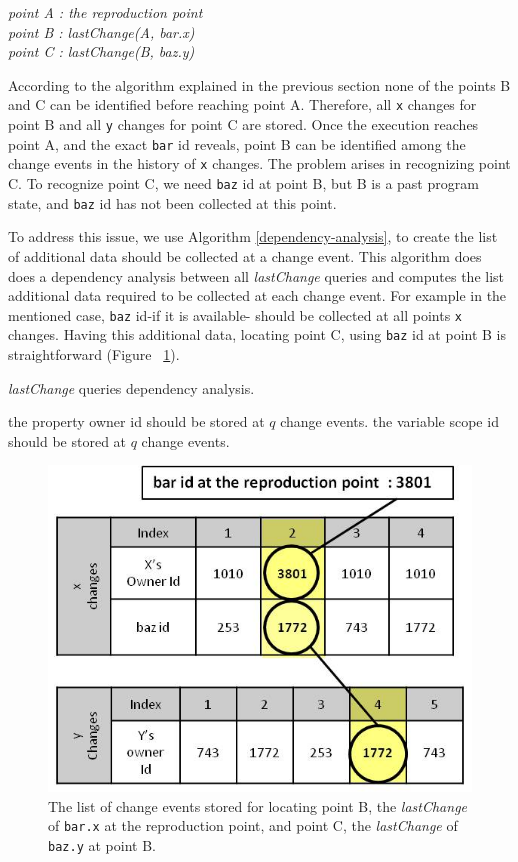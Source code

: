 \documentclass[preprint]{sigplanconf}
\begin{document}
\begin{center}
\textit{
 point A : the reproduction point \\
 point B : lastChange(A, bar.x) \\
 point C : lastChange(B, baz.y) 
 }
 \end{center}
According to the algorithm explained in the previous section none of
the points B and C can be identified before reaching point
A. Therefore, all \texttt{x} changes for point B and all \texttt{y}
changes for point C are stored. Once the execution reaches point A,
and the exact \texttt{bar} id reveals, point B can be identified among
the change events in the history of \texttt{x} changes. The problem
arises in recognizing point C. To recognize point C, we need
\texttt{baz} id at point B, but B is a past program state, and
\texttt{baz} id has not been collected at this point.

To address this issue, we use Algorithm \ref{dependency-analysis}, to
create the list of additional data should be collected at a change
event. This algorithm does does a dependency analysis between all
\textit{lastChange} queries and computes the list additional data
required to be collected at each change event. For example in the
mentioned case, \texttt{baz} id-if it is available- should be
collected at all points \texttt{x} changes. Having this additional
data, locating point C, using \texttt{baz} id at point B is
straightforward (Figure ~\ref{fig:lastchange-lastchange}).

\begin{algorithm}
\caption{\textit{lastChange} queries dependency analysis.}
\label{dependency-analysis}
\begin{algorithmic}

     \STATE the property owner id should be stored at $q$ change events. 
     \STATE the variable scope id should be stored at $q$ change events.
	 \ENDIF 
 \ENDFOR 
\ENDFOR

\end{algorithmic}
\end{algorithm}

\begin{figure}[htp]
\includegraphics[width=.48\textwidth]{8-lastchange-lastchange.jpg}
\caption{The list of change events stored for locating point B, the
  \textit{lastChange} of \texttt{bar.x} at the reproduction point, and
  point C, the \textit{lastChange} of \texttt{baz.y} at point B.}
\label{fig:lastchange-lastchange}
\end{figure}
\end{document}
